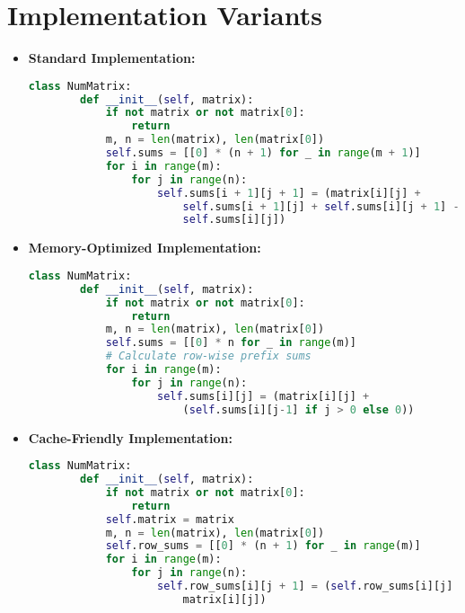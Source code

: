 \section*{Implementation Variants}
\begin{itemize}
    \item \textbf{Standard Implementation:}
    \begin{lstlisting}[language=Python]
    class NumMatrix:
        def __init__(self, matrix):
            if not matrix or not matrix[0]:
                return
            m, n = len(matrix), len(matrix[0])
            self.sums = [[0] * (n + 1) for _ in range(m + 1)]
            for i in range(m):
                for j in range(n):
                    self.sums[i + 1][j + 1] = (matrix[i][j] + 
                        self.sums[i + 1][j] + self.sums[i][j + 1] - 
                        self.sums[i][j])
    \end{lstlisting}

    \item \textbf{Memory-Optimized Implementation:}
    \begin{lstlisting}[language=Python]
    class NumMatrix:
        def __init__(self, matrix):
            if not matrix or not matrix[0]:
                return
            m, n = len(matrix), len(matrix[0])
            self.sums = [[0] * n for _ in range(m)]
            # Calculate row-wise prefix sums
            for i in range(m):
                for j in range(n):
                    self.sums[i][j] = (matrix[i][j] + 
                        (self.sums[i][j-1] if j > 0 else 0))
    \end{lstlisting}

    \item \textbf{Cache-Friendly Implementation:}
    \begin{lstlisting}[language=Python]
    class NumMatrix:
        def __init__(self, matrix):
            if not matrix or not matrix[0]:
                return
            self.matrix = matrix
            m, n = len(matrix), len(matrix[0])
            self.row_sums = [[0] * (n + 1) for _ in range(m)]
            for i in range(m):
                for j in range(n):
                    self.row_sums[i][j + 1] = (self.row_sums[i][j] + 
                        matrix[i][j])
    \end{lstlisting}
\end{itemize}

